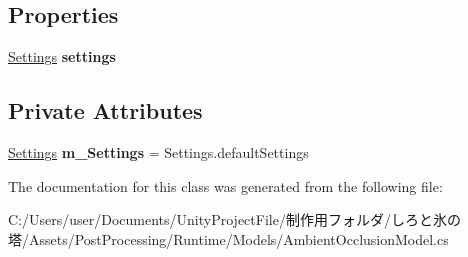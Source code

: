 \subsection*{Properties}
\begin{DoxyCompactItemize}
\item 
\mbox{\label{class_unity_engine_1_1_post_processing_1_1_ambient_occlusion_model_a6105dc68e0acd74c0b10137f664949b0}} 
\hyperlink{struct_unity_engine_1_1_post_processing_1_1_ambient_occlusion_model_1_1_settings}{Settings} {\bfseries settings}
\end{DoxyCompactItemize}
\subsection*{Private Attributes}
\begin{DoxyCompactItemize}
\item 
\mbox{\label{class_unity_engine_1_1_post_processing_1_1_ambient_occlusion_model_afc4ec03bcab06631864c18b6f01479c7}} 
\hyperlink{struct_unity_engine_1_1_post_processing_1_1_ambient_occlusion_model_1_1_settings}{Settings} {\bfseries m\+\_\+\+Settings} = Settings.\+default\+Settings
\end{DoxyCompactItemize}


The documentation for this class was generated from the following file\+:\begin{DoxyCompactItemize}
\item 
C\+:/\+Users/user/\+Documents/\+Unity\+Project\+File/制作用フォルダ/しろと氷の塔/\+Assets/\+Post\+Processing/\+Runtime/\+Models/Ambient\+Occlusion\+Model.\+cs\end{DoxyCompactItemize}
